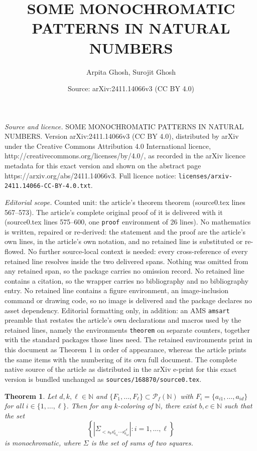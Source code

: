 \documentclass[10pt,a4paper]{amsart}
\title{SOME MONOCHROMATIC PATTERNS IN NATURAL NUMBERS}
\author{Arpita Ghosh, Surojit Ghosh}
\date{Source: arXiv:2411.14066v3 (CC BY 4.0)}
\newtheorem{theorem}{Theorem}
\begin{document}
\maketitle

\noindent\emph{Source and licence.} SOME MONOCHROMATIC PATTERNS IN NATURAL NUMBERS. Version arXiv:2411.14066v3 (CC BY 4.0), distributed by arXiv under the Creative Commons Attribution 4.0 International licence, http://creativecommons.org/licenses/by/4.0/, as recorded in the arXiv licence metadata for this exact version and shown on the abstract page https://arxiv.org/abs/2411.14066v3. Full licence notice: \texttt{licenses/arxiv-2411.14066-CC-BY-4.0.txt}.\par\smallskip

\noindent\textit{Editorial scope.} Counted unit: the article's theorem theorem (source0.tex lines 567--573). The article's complete original proof of it is delivered with it (source0.tex lines 575--600, one \texttt{proof} environment of 26 lines). No mathematics is written, repaired or re-derived: the statement and the proof are the article's own lines, in the article's own notation, and no retained line is substituted or re-flowed.  No further source-local context is needed: every cross-reference of every retained line resolves inside the two delivered spans.  Nothing was omitted from any retained span, so the package carries no omission record.  No retained line contains a citation, so the wrapper carries no bibliography and no bibliography entry.  No retained line contains a figure environment, an image-inclusion command or drawing code, so no image is delivered and the package declares no asset dependency.  Editorial formatting only, in addition: an AMS \texttt{amsart} preamble that restates the article's own declarations and macros used by the retained lines, namely the environments \texttt{theorem} on separate counters, together with the standard packages those lines need.  The retained environments print in this document as Theorem 1 in order of appearance, whereas the article prints the same items with the numbering of its own full document.  The complete native source of the article as distributed in the arXiv e-print for this exact version is bundled unchanged as \texttt{sources/168870/source0.tex}.
\begin{theorem}
Let \( d, k, \ell \in \mathbb{N} \) and \( \{F_1, \dots, F_\ell\} \subset \mathcal{P}_f(\mathbb{N}) \) with \( F_i = \{a_{i1}, \dots, a_{id}\} \) for all \( i \in \{1, \dots, \ell\} \). Then for any \( k \)-coloring of \( \mathbb{N} \), there exist \( b, c \in \mathbb{N} \) such that the set 
\[
\left\{\left|\Sigma_{<s_b s_{a_{i1}}^{c} \cdots s_{a_{id}}^{c^d}}\right| : i = 1, \dots, \ell \right\}
\]
is monochromatic, where \( \Sigma \) is the set of sums of two squares.
\end{theorem}
\end{document}
